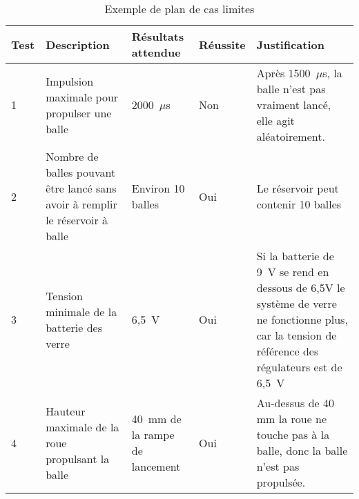 \begin{landscape}
\begin{table}[h!]
\begin{tabular}{p{0.5in}p{2in}p{1.5in}p{0.75in}p{3in}}
            \hline
        \end{tabular}
        \label{tab:s3-test-integration}
    \end{table}
    \begin{table}[h!]
        \centering
        \caption{Exemple de plan de cas limites}
        \begin{tabular}{p{0.5in}p{2in}p{1.5in}p{0.75in}p{3in}}
            \hline
            \bfseries Test & \bfseries Description & \bfseries Résultats attendue & \bfseries Réussite & \bfseries Justification \\
            \hline\hline
            1 & Impulsion maximale pour propulser une balle & 2000~$\mu$s & Non & Après 1500~$\mu$s, la balle n’est pas vraiment lancé, elle agit aléatoirement. \\
            2 & Nombre de balles pouvant être lancé sans avoir à remplir le réservoir à balle & Environ 10 balles & Oui & Le réservoir peut contenir 10 balles \\
            3 & Tension minimale de la batterie des verre & 6,5~V & Oui & Si la batterie de 9~V se rend en dessous de 6,5V le système de verre ne fonctionne plus, car la tension de référence des régulateurs est de 6,5~V \\
            4 & Hauteur maximale de la roue propulsant la balle & 40~mm de la rampe de lancement & Oui & Au-dessus de 40 mm la roue ne touche pas à la balle, donc la balle n’est pas propulsée. \\
            \hline
        \end{tabular}
        \label{tab:s3-test-cas-limites}
    \end{table}
\end{landscape}
